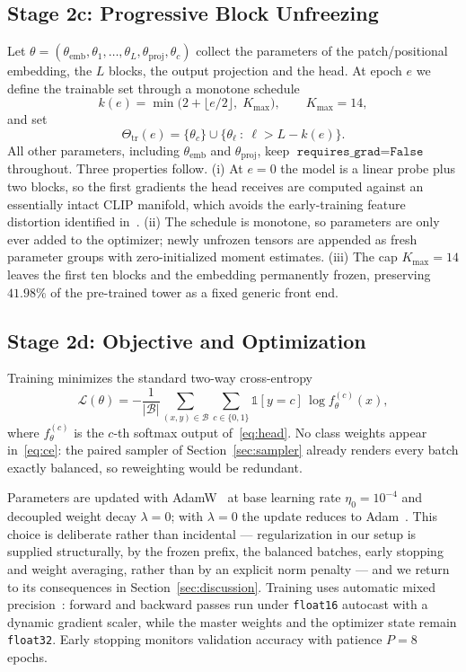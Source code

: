 \documentclass[10pt,journal]{IEEEtran}
\begin{document}
\subsection{Stage 2c: Progressive Block Unfreezing}\label{sec:unfreeze}
Let $\theta=(\theta_{\mathrm{emb}},\theta_1,\dots,\theta_L,
\theta_{\mathrm{proj}},\theta_c)$ collect the parameters of the patch/positional
embedding, the $L$ blocks, the output projection and the head. At epoch $e$ we
define the trainable set through a monotone schedule
\begin{equation}
k(e)=\min\big(2+\lfloor e/2\rfloor,\;K_{\max}\big),\qquad K_{\max}=14,
\label{eq:schedule}
\end{equation}
and set
\begin{equation}
\Theta_{\mathrm{tr}}(e)=\{\theta_c\}\cup
\{\theta_\ell\ :\ \ell>L-k(e)\}.
\end{equation}
All other parameters, including $\theta_{\mathrm{emb}}$ and
$\theta_{\mathrm{proj}}$, keep $\texttt{requires\_grad}=\texttt{False}$
throughout. Three properties follow. (i) At $e=0$ the model is a linear probe
plus two blocks, so the first gradients the head receives are computed against
an essentially intact CLIP manifold, which avoids the early-training feature
distortion identified in~\cite{kumar2022finetuning}. (ii) The schedule is
monotone, so parameters are only ever added to the optimizer; newly unfrozen
tensors are appended as fresh parameter groups with zero-initialized moment
estimates. (iii) The cap $K_{\max}=14$ leaves the first ten blocks and the
embedding permanently frozen, preserving $41.98\%$ of the pre-trained tower as
a fixed generic front end.

\subsection{Stage 2d: Objective and Optimization}\label{sec:optim}
Training minimizes the standard two-way cross-entropy
\begin{equation}
\mathcal{L}(\theta)=-\frac{1}{|\mathcal{B}|}\sum_{(x,y)\in\mathcal{B}}
\sum_{c\in\{0,1\}}\mathbb{1}[y=c]\,
\log f_\theta^{(c)}(x),
\label{eq:ce}
\end{equation}
where $f_\theta^{(c)}$ is the $c$-th softmax output of~\eqref{eq:head}. No
class weights appear in~\eqref{eq:ce}: the paired sampler
of Section~\ref{sec:sampler} already renders every batch exactly balanced, so
reweighting would be redundant.

Parameters are updated with AdamW~\cite{loshchilov2019adamw} at base learning
rate $\eta_0=10^{-4}$ and decoupled weight decay $\lambda=0$; with
$\lambda=0$ the update reduces to Adam~\cite{kingma2015adam}. This choice is
deliberate rather than incidental --- regularization in our setup is supplied
structurally, by the frozen prefix, the balanced batches, early stopping and
weight averaging, rather than by an explicit norm penalty --- and we return to
its consequences in Section~\ref{sec:discussion}. Training uses automatic
mixed precision~\cite{micikevicius2018mixed}: forward and backward passes run
under \texttt{float16} autocast with a dynamic gradient scaler, while the
master weights and the optimizer state remain \texttt{float32}. Early stopping
monitors validation accuracy with patience $P=8$ epochs.
\end{document}
